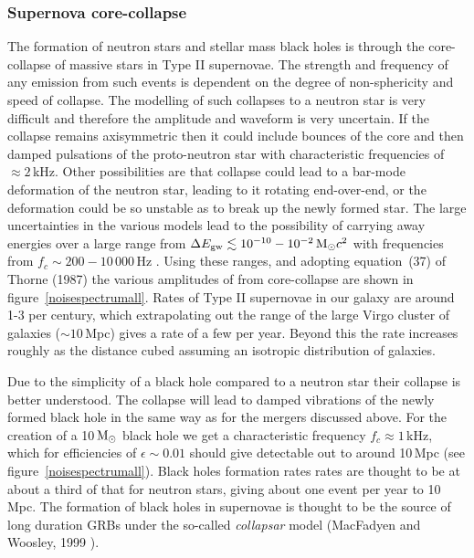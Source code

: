 \subsubsection{Supernova core-collapse}
The formation of neutron stars and stellar mass black holes is through the core-collapse of
massive stars in Type II supernovae. The strength and frequency of any \gw emission from such events
is dependent on the degree of non-sphericity and speed of collapse. The modelling of such collapses
to a neutron star is very difficult and therefore the \gw amplitude and waveform is very uncertain.
If the collapse remains axisymmetric then it could include bounces of the core and then damped
pulsations of the proto-neutron star with characteristic frequencies of $\approx 2$\,kHz. Other
possibilities are that collapse could lead to a bar-mode deformation of the neutron star, leading to
it rotating end-over-end, or the deformation could be so unstable as to break up the newly formed
star. The large uncertainties in the various models lead to the possibility of \gws carrying away
energies over a large range from $\Delta{}E_{\rm gw} \lesssim 10^{-10} - 10^{-2}\,{\rm
M}_{\odot}c^2$ with frequencies from $f_c \sim 200 - 10\,000$\,Hz \cite{300Years}. Using these
ranges, and adopting equation~(37) of Thorne (1987) \cite{300Years} the various amplitudes of \gw
from core-collapse are shown in figure~\ref{noisespectrumall}. Rates of Type II supernovae in our
galaxy are around 1-3 per century, which extrapolating out the range of the large Virgo cluster of
galaxies ($\sim 10$\,Mpc) gives a rate of a few per year. Beyond this the rate increases roughly as
the distance cubed assuming an isotropic distribution of galaxies.

Due to the simplicity of a black hole compared to a neutron star their collapse is better
understood. The collapse will lead to damped vibrations of the newly formed black hole in the same
way as for the mergers discussed above. For the creation of a 10\,${\rm M}_{\odot}$ black hole we
get a characteristic frequency $f_c \approx 1$\,kHz, which for efficiencies of $\epsilon \sim 0.01$
should give detectable \gws out to around 10\,Mpc (see figure~\ref{noisespectrumall}). Black holes
formation rates rates are thought to be at about a third of that for neutron stars, giving about
one event per year to 10\,Mpc. The formation of black holes in supernovae is thought to be the
source of long duration GRBs under the so-called {\it collapsar} model (MacFadyen and Woosley, 1999
\cite{MacFadyen:1999}).

